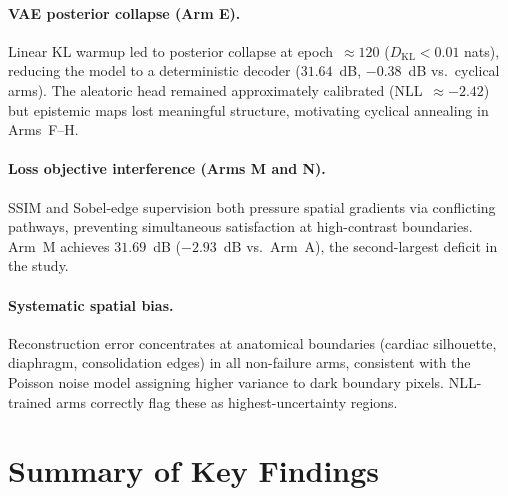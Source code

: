 \documentclass[12pt, a4paper, twoside, openright]{book}
\begin{document}
\paragraph{VAE posterior collapse (Arm E).}
Linear KL warmup led to posterior collapse at epoch~$\approx120$ ($D_\mathrm{KL}<0.01$ nats), reducing the model to a deterministic decoder ($31.64$~dB, $-0.38$~dB vs.\ cyclical arms). The aleatoric head remained approximately calibrated (NLL~$\approx-2.42$) but epistemic maps lost meaningful structure, motivating cyclical annealing in Arms~F--H.

\paragraph{Loss objective interference (Arms M and N).}
SSIM and Sobel-edge supervision both pressure spatial gradients via conflicting pathways, preventing simultaneous satisfaction at high-contrast boundaries. Arm~M achieves $31.69$~dB ($-2.93$~dB vs.\ Arm~A), the second-largest deficit in the study.

\paragraph{Systematic spatial bias.}
Reconstruction error concentrates at anatomical boundaries (cardiac silhouette, diaphragm, consolidation edges) in all non-failure arms, consistent with the Poisson noise model assigning higher variance to dark boundary pixels. NLL-trained arms correctly flag these as highest-uncertainty regions.

\section{Summary of Key Findings}
\label{sec:results:summary}
\end{document}
